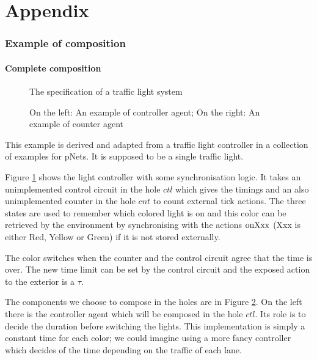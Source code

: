 \documentclass{article}
\begin{document}
\pagebreak



\pagebreak
\appendix
\part*{Appendix}

\section{Example of composition}

\subsection{Complete composition}\label{apx:composition}
\begin{figure}[h]
\centering

\caption{The specification of a traffic light system}
\label{fig:tls}
\end{figure}
\begin{figure}
\centering

\vrule

\caption{On the left: An example of controller agent; On the right: An example of counter agent}
\label{fig:tlh}
\end{figure}
This example is derived and adapted from a traffic light controller in a collection of examples for pNets.
It is supposed to be a single traffic light.

Figure \ref{fig:tls} shows the light controller with some synchronisation logic.
It takes an unimplemented control circuit in the hole \(ctl\) which gives the timings and an also unimplemented counter in the hole \(cnt\) to count external \(\mathrm{tick}\) actions.
The three states are used to remember which colored light is on and this color can be retrieved by the environment by synchronising with the actions \(\mathrm{onXxx}\) (Xxx is either Red, Yellow or Green) if it is not stored externally.

The color switches when the counter and the control circuit agree that the time is over.
The new time limit can be set by the control circuit and the exposed action to the exterior is a \(\tau\).

The components we choose to compose in the holes are in Figure \ref{fig:tlh}.
On the left there is the controller agent which will be composed in the hole \(ctl\).
Its role is to decide the duration before switching the lights.
This implementation is simply a constant time for each color; we could imagine using a more fancy controller which decides of the time depending on the traffic of each lane.
\end{document}
